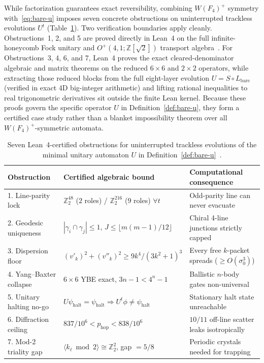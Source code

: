 While factorization guarantees exact reversibility, combining $W(F_4)^+$ symmetry with~\eqref{eq:bare-u} imposes seven concrete obstructions on uninterrupted trackless evolutions $U^t$ (Table~\ref{tab:obstructions}). Two verification boundaries apply cleanly. Obstructions~1, 2, and 5 are proved directly in Lean~4 on the full infinite-honeycomb Fock unitary and $O^+(4,1;\mathbb{Z}[\sqrt{2}])$ transport algebra~\cite{pollard2026repo}. For Obstructions~3, 4, 6, and 7, Lean~4 proves the exact cleared-denominator algebraic and matrix theorems on the reduced $6\times 6$ and $2\times 2$ operators, while extracting those reduced blocks from the full eight-layer evolution $U = S \circ L_{\mathrm{bare}}$ (verified in exact 4D big-integer arithmetic) and lifting rational inequalities to real trigonometric derivatives sit outside the finite Lean kernel. Because these proofs govern the specific operator $U$ in Definition~\ref{def:bare-u}, they form a certified case study rather than a blanket impossibility theorem over all $W(F_4)^+$-symmetric automata.

\begin{table}[tb]
\centering
\caption{Seven Lean~4-certified obstructions for uninterrupted trackless evolutions of the minimal unitary automaton $U$ in Definition~\ref{def:bare-u}~\cite{pollard2026repo}.}
\label{tab:obstructions}
\small
\begin{tabular}{@{}lll@{}}
\toprule
Obstruction & Certified algebraic bound & Computational consequence \\
\midrule
1. Line-parity lock & $\mathbb{Z}_2^{48}$ ($2$ roles) / $\mathbb{Z}_2^{216}$ ($9$ roles) $\forall t$ & Odd-parity line can never evacuate \\
2. Geodesic uniqueness & $|\gamma_i \cap \gamma_j| \le 1$, $J \le \lfloor m(m-1)/12 \rfloor$ & Chiral 4-line junctions strictly capped \\
3. Dispersion floor & $(v'_k)^2 + (v''_k)^2 \ge 9k^4/(3k^2+1)^3$ & Every free $k$-packet spreads ($\ge O(\sigma_0^3)$) \\
4. Yang--Baxter collapse & $6\times 6$ YBE exact, $3n-1 < 4^n-1$ & Ballistic $n$-body gates non-universal \\
5. Unitary halting no-go & $U\psi_{\mathrm{halt}} = \psi_{\mathrm{halt}} \Rightarrow U^t\phi \neq \psi_{\mathrm{halt}}$ & Stationary halt state unreachable \\
6. Diffraction ceiling & $837/10^6 < p_{\mathrm{hop}} < 838/10^6$ & $10/11$ off-line scatter leaks isotropically \\
7. Mod-2 triality gap & $\langle k_\ell \bmod 2 \rangle \cong \mathbb{Z}_2^2$, gap $= 5/8$ & Periodic crystals needed for trapping \\
\bottomrule
\end{tabular}
\end{table}


